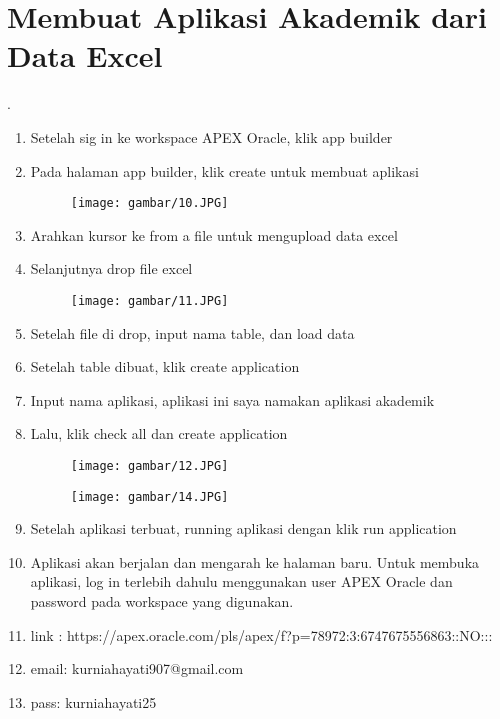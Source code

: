 \section{Membuat Aplikasi Akademik dari Data Excel}.
\begin{enumerate}
    \item Setelah sig in ke workspace APEX Oracle, klik app builder
    \item Pada halaman app builder, klik create untuk membuat aplikasi

\begin{figure}[!htbp]
    \centering
    \texttt{[image: gambar/10.JPG]}
    \label{penanda}
\end{figure}

    \item Arahkan kursor ke from a file untuk mengupload data excel
    \item Selanjutnya drop file excel

\begin{figure}[!htbp]
    \centering
    \texttt{[image: gambar/11.JPG]}
    \label{penanda}
\end{figure}

    \item Setelah file di drop, input nama table, dan load data
    \item Setelah table dibuat, klik create application
    \item Input nama aplikasi, aplikasi ini saya namakan aplikasi akademik
    \item Lalu, klik check all dan create application
    
\begin{figure}[!htbp]
    \centering
    \texttt{[image: gambar/12.JPG]}
    \label{penanda}
\end{figure}

\begin{figure}[!htbp]
    \centering
    \texttt{[image: gambar/14.JPG]}
    \label{penanda}
\end{figure}
    
    \item Setelah aplikasi terbuat, running aplikasi dengan klik run application
    \item Aplikasi akan berjalan dan mengarah ke halaman baru. Untuk membuka aplikasi, log in terlebih dahulu menggunakan user APEX Oracle dan password pada workspace yang digunakan.

    \item link : https://apex.oracle.com/pls/apex/f?p=78972:3:6747675556863::NO:::
    \item {email: kurniahayati907@gmail.com}
    \item {pass: kurniahayati25}
    
\end{enumerate}